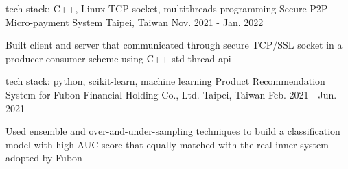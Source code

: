 \begin{cventries}
  \cventry
    {\color{awesome} tech stack: C++, Linux TCP socket, multithreads programming} %
    {Secure P2P Micro-payment System}
    {Taipei, Taiwan} %
    {Nov. 2021 - Jan. 2022} %
    {
      \begin{cvitems} %
        \item {Built client and server that communicated through secure TCP/SSL socket in a producer-consumer scheme using C++ std thread api}
      \end{cvitems}
    }

  \cventry
    {\color{awesome} tech stack: python, scikit-learn, machine learning} %
    {Product Recommendation System for Fubon Financial Holding Co., Ltd.}
    {Taipei, Taiwan} %
    {Feb. 2021 - Jun. 2021} %
    {
      \begin{cvitems} %
        \item {Used ensemble and over-and-under-sampling techniques to build a classification model with high AUC score that equally matched with the real inner system adopted by Fubon}
      \end{cvitems}
    }


\end{cventries}
